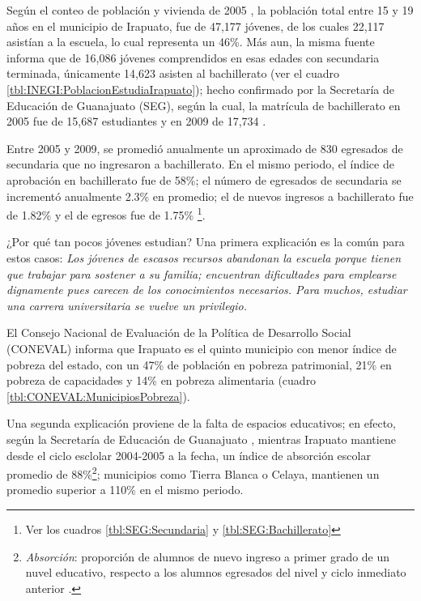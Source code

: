 Según el conteo de población y vivienda de 2005 \citep{Inegi2005}, la población total entre 15 y 19 años en el municipio de Irapuato, fue de 47,177 jóvenes, de los cuales 22,117 asistían a la escuela, lo cual representa un 46\%. Más aun, la misma fuente informa que de 16,086 jóvenes comprendidos en esas edades con secundaria terminada, únicamente 14,623 asisten al bachillerato (ver el cuadro \ref{tbl:INEGI:PoblacionEstudiaIrapuato}); hecho confirmado por la Secretaría de Educación de Guanajuato (SEG), según la cual, la matrícula de bachillerato en 2005 fue de 15,687 estudiantes y en 2009 de 17,734 \citep{Seg2010}.



Entre 2005 y 2009, se promedió anualmente un aproximado de 830 egresados de secundaria que no ingresaron a bachillerato. En el mismo periodo, el índice de aprobación en bachillerato fue de 58\%; el número de egresados de secundaria se incrementó anualmente 2.3\% en promedio; el de nuevos ingresos a bachillerato fue de 1.82\% y el de egresos fue de 1.75\% \citep{Seg2010}\footnote{Ver los cuadros \ref{tbl:SEG:Secundaria} y \ref{tbl:SEG:Bachillerato}}.

¿Por qué tan pocos jóvenes estudian? Una primera explicación es la común para estos casos: \emph{Los jóvenes de escasos recursos abandonan la escuela porque tienen que trabajar para sostener a su familia; encuentran dificultades para emplearse dignamente pues carecen de los conocimientos necesarios. Para muchos, estudiar una carrera universitaria se vuelve un privilegio.}

El Consejo Nacional de Evaluación de la Política de Desarrollo Social (CONEVAL) informa que Irapuato es el quinto municipio con menor índice de pobreza del estado, con un 47\% de población en pobreza patrimonial, 21\% en pobreza de capacidades y 14\% en pobreza alimentaria \citep{Coneval2009} (cuadro \ref{tbl:CONEVAL:MunicipiosPobreza}).

Una segunda explicación proviene de la falta de espacios educativos; en efecto, según la Secretaría de Educación de Guanajuato \citep{Seg2010}, mientras  Irapuato mantiene desde el ciclo esclolar 2004-2005 a la fecha, un índice de absorción escolar promedio de 88\%\footnote{\emph{Absorción}: proporción de alumnos de nuevo ingreso a primer grado de un nuvel educativo, respecto a los alumnos egresados del nivel y ciclo inmediato anterior \citep{Seg2010}.};
municipios como Tierra Blanca o Celaya, mantienen un promedio superior a 110\% en el mismo periodo.

